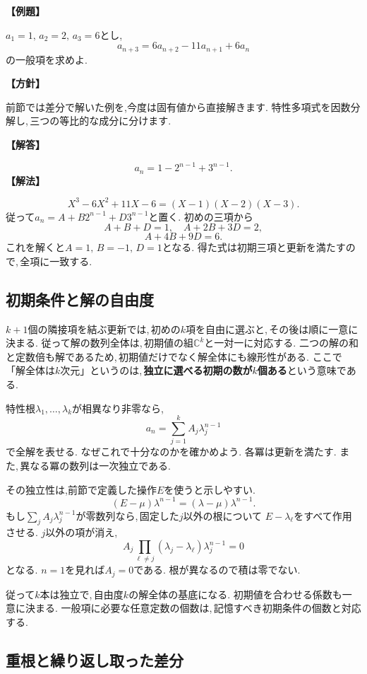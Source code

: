\noindent\textbf{【例題】}\par\nobreak
$a_1=1,\,a_2=2,\,a_3=6$とし,
\[
 a_{n+3}=6a_{n+2}-11a_{n+1}+6a_n
\]
の一般項を求めよ.

\noindent\textbf{【方針】}\par\nobreak
前節では差分で解いた例を,今度は固有値から直接解きます. 特性多項式を因数分解し,\,三つの等比的な成分に分けます.

\noindent\textbf{【解答】}\par\nobreak
\[
 a_n=1-2^{n-1}+3^{n-1}.
\]
\noindent\textbf{【解法】}\par\nobreak
\[
 X^3-6X^2+11X-6=(X-1)(X-2)(X-3).
\]
従って$a_n=A+B2^{n-1}+D3^{n-1}$と置く.
初めの三項から
\[
 A+B+D=1,\quad A+2B+3D=2,
\]
\[
 A+4B+9D=6.
\]
これを解くと$A=1,\,B=-1,\,D=1$となる.
得た式は初期三項と更新を満たすので,\,全項に一致する.

\subsection{初期条件と解の自由度}\label{節：初期条件と解の自由度}

$k+1$個の隣接項を結ぶ更新では,\,初めの$k$項を自由に選ぶと,\,その後は順に一意に決まる.
従って解の数列全体は,\,初期値の組$\mathbb C^k$と一対一に対応する.
二つの解の和と定数倍も解であるため,\,初期値だけでなく解全体にも線形性がある.
ここで「解全体は$k$次元」というのは,\,\textbf{独立に選べる初期の数が$k$個ある}という意味である.

特性根$\lambda_1,\ldots,\lambda_k$が相異なり非零なら,
\[
 a_n=\sum_{j=1}^{k}A_j\lambda_j^{n-1}
\]
で全解を表せる.
なぜこれで十分なのかを確かめよう.
各冪は更新を満たす. また,\,異なる冪の数列は一次独立である.

その独立性は,前節で定義した操作$E$を使うと示しやすい.
\[
 (E-\mu)\lambda^{n-1}
 =(\lambda-\mu)\lambda^{n-1}.
\]
もし$\sum_j A_j\lambda_j^{n-1}$が零数列なら,\,固定した$j$以外の根について
$E-\lambda_\ell$をすべて作用させる.
$j$以外の項が消え,
\[
 A_j\prod_{\ell\ne j}(\lambda_j-\lambda_\ell)
 \lambda_j^{n-1}=0
\]
となる. $n=1$を見れば$A_j=0$である.
根が異なるので積は零でない.

従って$k$本は独立で,\,自由度$k$の解全体の基底になる.
初期値を合わせる係数も一意に決まる.
一般項に必要な任意定数の個数は,\,記憶すべき初期条件の個数と対応する.

\subsection{重根と繰り返し取った差分}

